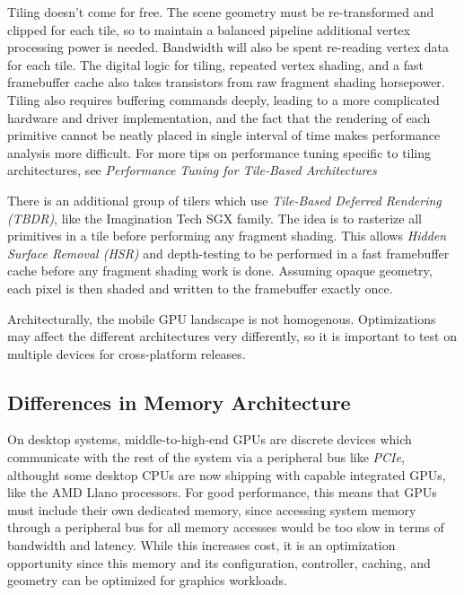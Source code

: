 Tiling doesn't come for free.  The scene geometry must be re-transformed and
clipped for each
 tile, so to maintain a balanced pipeline additional vertex
processing power is
 needed.  Bandwidth will also be spent re-reading vertex
data for each tile.  The digital
 logic for tiling, repeated vertex shading,
and a fast framebuffer cache also
 takes transistors from raw fragment shading
horsepower.  Tiling also requires buffering commands deeply, leading to a more
complicated hardware and driver implementation, and the fact that the rendering
of each primitive cannot be neatly placed in single interval of time makes
performance analysis more difficult.  For more tips on
 performance tuning
specific to tiling architectures, see \textit{Performance
 Tuning for
Tile-Based Architectures} \cite{Chapter TODO}
 

 There is an additional group of tilers
which use \textit{Tile-Based Deferred Rendering (TBDR)}, like the Imagination Tech SGX
family.  The idea is to rasterize all primitives in a tile before performing
any fragment shading.  This allows \textit{Hidden Surface Removal (HSR)} and
depth-testing to be performed in a fast framebuffer cache before any fragment
shading work is done.  Assuming opaque geometry, each pixel is then shaded and
written to the framebuffer exactly once.

Architecturally, the mobile GPU landscape is not homogenous.  Optimizations may
affect the different architectures very differently, so it is important to test
on multiple devices for cross-platform releases.  \subsection{Differences in
Memory
Architecture}\label{Jon-McCaffrey:differences-in-memory-architecture}

On desktop systems, middle-to-high-end GPUs are discrete devices which
communicate with the rest of the system via a peripheral bus like
\textit{PCIe}, althought some desktop CPUs are now shipping with capable
integrated GPUs, like the AMD Llano processors.  For good performance, this
means that GPUs must include their own dedicated memory, since accessing system
memory through a peripheral bus for all memory accesses would be too slow in
terms of bandwidth and latency.  While this increases cost, it is an
optimization opportunity since this memory and its configuration, controller,
caching, and geometry can be optimized for graphics workloads.

